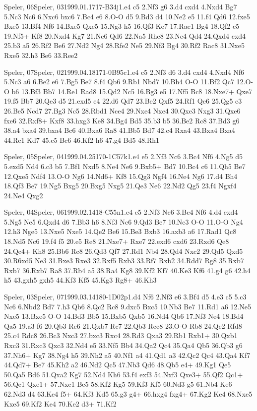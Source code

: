 \documentclass[twocolumn,a4paper,10pt]{report}
\begin{document}
\begin{chessgame}{Speler, 06}{Speler, 03}{1999.01.17}{17}{\textonehalf-\textonehalf}{B34j}{1.e4 c5 2.Nf3 g6 3.d4 cxd4 4.Nxd4 Bg7 5.Nc3 Nc6 6.Nxc6 bxc6 7.Bc4 e6 8.O-O d5 9.Bd3 d4 10.Ne2 e5 11.f4 Qd6 12.fxe5 Bxe5 13.Bf4 Nf6 14.Bxe5 Qxe5 15.Ng3 h5 16.Qf3 Ke7 17.Rae1 Bg4 18.Qf2 c5 19.Nf5+ Kf8 20.Nxd4 Kg7 21.Nc6 Qd6 22.Na5 Rhe8 23.Nc4 Qd4 24.Qxd4 cxd4 25.b3 a5 26.Rf2 Be6 27.Nd2 Ng4 28.Rfe2 Ne5 29.Nf3 Bg4 30.Rf2 Rac8 31.Nxe5 Rxe5 32.h3 Be6 33.Ree2}\end{chessgame}
\begin{chessgame}{Speler, 07}{Speler, 02}{1999.04.18}{17}{1-0}{B95c}{1.e4 c5 2.Nf3 d6 3.d4 cxd4 4.Nxd4 Nf6 5.Nc3 a6 6.Be2 e6 7.Bg5 Be7 8.f4 Qb6 9.Rb1 Nbd7 10.Bh4 O-O 11.Bf2 Qc7 12.O-O b6 13.Bf3 Bb7 14.Re1 Rad8 15.Qd2 Nc5 16.Bg3 e5 17.Nf5 Bc8 18.Nxe7+ Qxe7 19.f5 Bb7 20.Qe3 d5 21.exd5 e4 22.d6 Qd7 23.Be2 Qxf5 24.Rf1 Qe6 25.Qg5 e3 26.Be5 Ncd7 27.Bg3 Nc5 28.Rbd1 Nce4 29.Nxe4 Nxe4 30.Qxe3 Nxg3 31.Qxe6 fxe6 32.Rxf8+ Kxf8 33.hxg3 Ke8 34.Bg4 Bd5 35.b3 b5 36.Be2 Rc8 37.Bd3 g6 38.a4 bxa4 39.bxa4 Bc6 40.Bxa6 Ra8 41.Bb5 Bd7 42.c4 Rxa4 43.Bxa4 Bxa4 44.Rc1 Kd7 45.c5 Bc6 46.Kf2 h6 47.g4 Bd5 48.Rh1}\end{chessgame}
\begin{chessgame}{Speler, 05}{Speler, 04}{1999.04.25}{17}{0-1}{C57k}{1.e4 e5 2.Nf3 Nc6 3.Bc4 Nf6 4.Ng5 d5 5.exd5 Nd4 6.c3 b5 7.Bf1 Nxd5 8.Ne4 Ne6 9.Bxb5+ Bd7 10.Bc4 c6 11.Qh5 Be7 12.Qxe5 Ndf4 13.O-O Ng6 14.Nd6+ Kf8 15.Qg3 Ngf4 16.Ne4 Ng6 17.d4 Bh4 18.Qf3 Be7 19.Ng5 Bxg5 20.Bxg5 Nxg5 21.Qe3 Ne6 22.Nd2 Qg5 23.f4 Ngxf4 24.Ne4 Qxg2\mate}\end{chessgame}
\begin{chessgame}{Speler, 04}{Speler, 06}{1999.02.14}{18}{\textonehalf-\textonehalf}{C55n}{1.e4 e5 2.Nf3 Nc6 3.Bc4 Nf6 4.d4 exd4 5.Ng5 Ne5 6.Qxd4 d6 7.Bb3 h6 8.Nf3 Nc6 9.Qd3 Be7 10.Nc3 O-O 11.O-O Ng4 12.h3 Nge5 13.Nxe5 Nxe5 14.Qe2 Be6 15.Be3 Bxb3 16.axb3 a6 17.Rad1 Qc8 18.Nd5 Nc6 19.f4 f5 20.e5 Re8 21.Nxe7+ Rxe7 22.exd6 cxd6 23.Rxd6 Qe8 24.Qc4+ Kh8 25.Bb6 Rc8 26.Qd3 Qf7 27.Rd1 Nb4 28.Qd4 Nxc2 29.Qd5 Qxd5 30.R6xd5 Ne3 31.Bxe3 Rxe3 32.Rxf5 Rxb3 33.Rf7 Rxb2 34.Rdd7 Rg8 35.Rxb7 Rxb7 36.Rxb7 Ra8 37.Rb4 a5 38.Ra4 Kg8 39.Kf2 Kf7 40.Ke3 Kf6 41.g4 g6 42.h4 h5 43.gxh5 gxh5 44.Kf3 Kf5 45.Kg3 Rg8+ 46.Kh3}\end{chessgame}
\begin{chessgame}{Speler, 03}{Speler, 07}{1999.03.14}{18}{0-1}{D02p}{1.d4 Nf6 2.Nf3 e6 3.Bf4 d5 4.e3 c5 5.c3 Nc6 6.Nbd2 Bd7 7.h3 Qb6 8.Qc2 Rc8 9.dxc5 Bxc5 10.Nb3 Be7 11.Rd1 a6 12.Ne5 Nxe5 13.Bxe5 O-O 14.Bd3 Bb5 15.Bxb5 Qxb5 16.Nd4 Qb6 17.Nf3 Ne4 18.Bd4 Qa5 19.a3 f6 20.Qb3 Rc6 21.Qxb7 Rc7 22.Qb3 Rcc8 23.O-O Rb8 24.Qc2 Rfd8 25.c4 Rdc8 26.Bc3 Nxc3 27.bxc3 Rxc4 28.Rd3 Qxa3 29.Rb1 Rxb1+ 30.Qxb1 Rxc3 31.Rxc3 Qxc3 32.Nd4 e5 33.Nf5 Bb4 34.Qa2 Qc4 35.Qa4 Qb5 36.Qb3 g6 37.Nh6+ Kg7 38.Ng4 h5 39.Nh2 a5 40.Nf1 a4 41.Qd1 a3 42.Qc2 Qc4 43.Qa4 Kf7 44.Qd7+ Be7 45.Kh2 a2 46.Nd2 Qc5 47.Nb3 Qd6 48.Qb5 e4+ 49.Kg1 Qe5 50.Qa5 Bd6 51.Qxa2 Kg7 52.Nd4 Kh6 53.f4 exf3 54.Nxf3 Qxe3+ 55.Qf2 Qc1+ 56.Qe1 Qxe1+ 57.Nxe1 Be5 58.Kf2 Kg5 59.Kf3 Kf5 60.Nd3 g5 61.Nb4 Ke6 62.Nd3 d4 63.Ke4 f5+ 64.Kf3 Kd5 65.g3 g4+ 66.hxg4 fxg4+ 67.Kg2 Ke4 68.Nxe5 Kxe5 69.Kf2 Ke4 70.Ke2 d3+ 71.Kf2}\end{chessgame}
\end{document}
